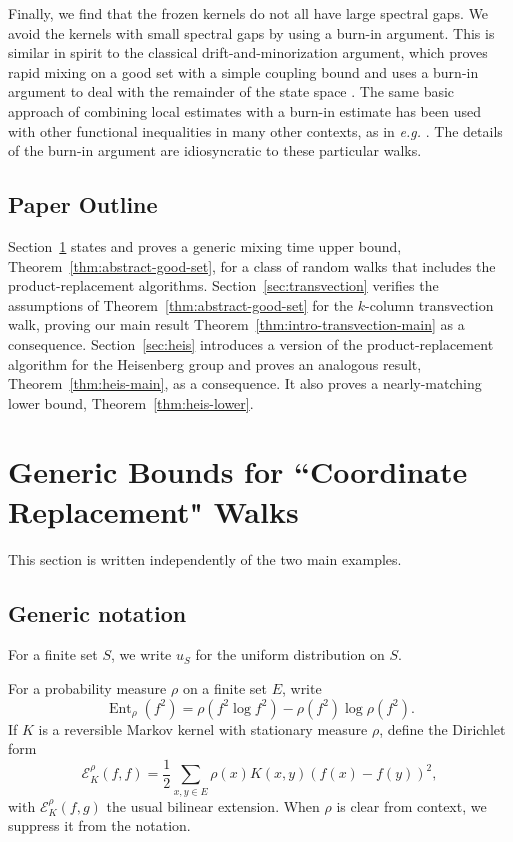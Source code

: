 \documentclass[11pt, reqno]{amsart}
\numberwithin{equation}{section}
\newcommand{\Ent}{\operatorname{Ent}}
\newcommand{\cE}{\mathcal E}
\begin{document}
Finally, we find that the frozen kernels do not all have large spectral gaps. We avoid the kernels with small spectral gaps by using a burn-in argument. This is similar in spirit to the classical drift-and-minorization argument, which proves rapid mixing on a good set with a simple coupling bound and uses a burn-in argument to deal with the remainder of the state space \cite{Rosenthal1995Minorization}. The same basic approach of combining local estimates with a burn-in estimate has been used with other functional inequalities in many other contexts, as in \textit{e.g.} \cite{chen2020fast}. The details of the burn-in argument are idiosyncratic to these particular walks.

\subsection{Paper Outline}
Section~\ref{sec:framework} states and proves a generic mixing time upper bound, Theorem~\ref{thm:abstract-good-set}, for a class of random walks that includes the product-replacement algorithms.  Section~\ref{sec:transvection} verifies the assumptions of Theorem~\ref{thm:abstract-good-set} for the \(k\)-column transvection walk, proving our main result
Theorem~\ref{thm:intro-transvection-main} as a consequence.  Section~\ref{sec:heis} introduces a version of the product-replacement algorithm for the Heisenberg group and proves an analogous result, Theorem~\ref{thm:heis-main}, as a consequence. It also proves a nearly-matching lower bound, Theorem~\ref{thm:heis-lower}. 

\section{Generic Bounds for ``Coordinate Replacement" Walks}\label{sec:framework}

This section is written independently of the two main examples. 


\subsection{Generic notation}

For a finite set $S$, we write $u_{S}$ for the uniform distribution on $S$.

For a probability measure \(\rho\) on a finite set \(E\), write
\[
    \Ent_\rho(f^2)=\rho(f^2\log f^2)-\rho(f^2)\log\rho(f^2).
\]
If \(K\) is a reversible Markov kernel with stationary measure \(\rho\), define the Dirichlet form
\[
    \cE_K^\rho(f,f)=\frac12\sum_{x,y\in E}\rho(x)K(x,y)(f(x)-f(y))^2,
\]
with $\cE_K^\rho(f,g)$ the usual bilinear extension. When \(\rho\) is clear from context, we suppress it from the notation.
\end{document}
